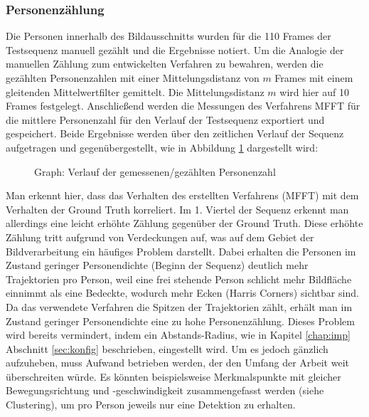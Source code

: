 \subsubsection{Personenzählung}
Die Personen innerhalb des Bildausschnitts wurden für die 110 Frames der Testsequenz manuell gezählt und die Ergebnisse notiert. Um die Analogie der manuellen Zählung zum entwickelten Verfahren zu bewahren, werden die gezählten Personenzahlen mit einer Mittelungsdistanz von $m$ Frames mit einem gleitenden Mittelwertfilter gemittelt. Die Mittelungsdistanz $m$ wird hier auf 10 Frames festgelegt. Anschließend werden die Messungen des Verfahrens MFFT für die mittlere Personenzahl für den Verlauf der Testsequenz exportiert und gespeichert. Beide Ergebnisse werden über den zeitlichen Verlauf der Sequenz aufgetragen und gegenübergestellt, wie in Abbildung \ref{zahl} dargestellt wird:
\newpage
\begin{figure}[h]
  \centering
  \caption{Graph: Verlauf der gemessenen/gezählten Personenzahl \cite{CourtyPRL2014} \cite{Allain2012ICPR}}
  \label{zahl}
\end{figure}

Man erkennt hier, dass das Verhalten des erstellten Verfahrens (MFFT) mit dem Verhalten der Ground Truth korreliert. Im 1. Viertel der Sequenz erkennt man allerdings eine leicht erhöhte Zählung gegenüber der Ground Truth. Diese erhöhte Zählung tritt aufgrund von Verdeckungen auf, was auf dem Gebiet der Bildverarbeitung ein häufiges Problem darstellt. Dabei erhalten die Personen im Zustand geringer Personendichte (Beginn der Sequenz) deutlich mehr Trajektorien pro Person, weil eine frei stehende Person schlicht mehr Bildfläche einnimmt als eine Bedeckte, wodurch mehr Ecken (Harris Corners) sichtbar sind. Da das verwendete Verfahren die Spitzen der Trajektorien zählt, erhält man im Zustand geringer Personendichte eine zu hohe Personenzählung. Dieses Problem wird bereits vermindert, indem ein Abstands-Radius, wie in Kapitel \ref{chap:imp} Abschnitt \ref{sec:konfig} beschrieben, eingestellt wird. Um es jedoch gänzlich aufzuheben, muss Aufwand betrieben werden, der den Umfang der Arbeit weit überschreiten würde. Es könnten beispielsweise Merkmalspunkte mit gleicher Bewegungsrichtung und -geschwindigkeit zusammengefasst werden (siehe Clustering), um pro Person jeweils nur eine Detektion zu erhalten.

